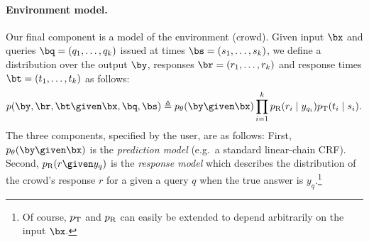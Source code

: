 





\paragraph{Environment model.}

Our final component is a model of the environment (crowd).
Given input $\bx$ and queries $\bq = (q_1, \dots, q_k)$ issued at times $\bs = (s_1, \dots, s_k)$,
we define a distribution over the output $\by$, responses $\br = (r_1, \dots, r_k)$
and response times $\bt = (t_1, \dots, t_k)$ as follows:
\begin{align}
  \label{eqn:dynamics}
p(\by, \br, \bt \given \bx, \bq, \bs) \eqdef \p(\by \given \bx) \prod_{i=1}^k \presp(r_i \mid y_{q_i}) \ptime(t_i \mid s_i).
\end{align}
The three components, specified by the user, are as follows:
First, $\p(\by \given \bx)$ is the \emph{prediction model} (e.g.\ a standard linear-chain CRF).
Second, $\presp(r \given y_q)$ is the \emph{response model} which describes the distribution of the crowd's response $r$ for a given a query $q$ when the true answer is $y_q$.\footnote{
Of course, $p_{\text{T}}$ and $p_{\text{R}}$ can easily be extended to depend arbitrarily on the input $\bx$.} 

